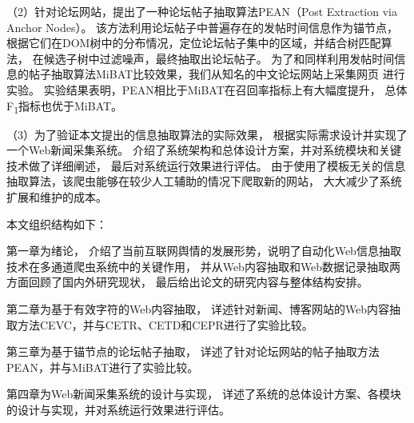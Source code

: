 （2）针对论坛网站，提出了一种论坛帖子抽取算法PEAN（Post Extraction via Anchor Nodes）。
该方法利用论坛帖子中普遍存在的发帖时间信息作为锚节点，
根据它们在DOM树中的分布情况，定位论坛帖子集中的区域，并结合树匹配算法，
在候选子树中过滤噪声，最终抽取出论坛帖子。
为了和同样利用发帖时间信息的帖子抽取算法MiBAT比较效果，我们从知名的中文论坛网站上采集网页
进行实验。
实验结果表明，PEAN相比于MiBAT在召回率指标上有大幅度提升，
总体F\textsubscript{1}指标也优于MiBAT。

（3）为了验证本文提出的信息抽取算法的实际效果，
根据实际需求设计并实现了一个Web新闻采集系统。
介绍了系统架构和总体设计方案，并对系统模块和关键技术做了详细阐述，
最后对系统运行效果进行评估。
由于使用了模板无关的信息抽取算法，该爬虫能够在较少人工辅助的情况下爬取新的网站，
大大减少了系统扩展和维护的成本。

本文组织结构如下：

第一章为绪论，
介绍了当前互联网舆情的发展形势，说明了自动化Web信息抽取技术在多通道爬虫系统中的关键作用，
并从Web内容抽取和Web数据记录抽取两方面回顾了国内外研究现状，
最后给出论文的研究内容与整体结构安排。

第二章为基于有效字符的Web内容抽取，
详述针对新闻、博客网站的Web内容抽取方法CEVC，并与CETR、CETD和CEPR进行了实验比较。

第三章为基于锚节点的论坛帖子抽取，
详述了针对论坛网站的帖子抽取方法PEAN，并与MiBAT进行了实验比较。

第四章为Web新闻采集系统的设计与实现，
详述了系统的总体设计方案、各模块的设计与实现，并对系统运行效果进行评估。
